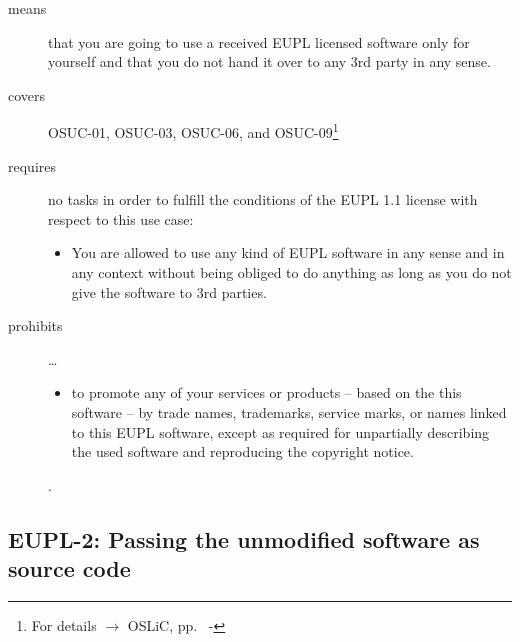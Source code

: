 \begin{description}

\item[means] that you are going to use a received EUPL licensed software only
for yourself and that you do not hand it over to any 3rd party in any sense.

\item[covers] OSUC-01, OSUC-03, OSUC-06, and OSUC-09\footnote{For details 
$\rightarrow$ OSLiC, pp.\ \pageref{OSUC-01-DEF} - \pageref{OSUC-09-DEF}}

\item[requires] no tasks in order to fulfill the conditions of the EUPL 1.1
license with respect to this use case:
  \begin{itemize}
    \item You are allowed to use any kind of EUPL software in any sense and in
    any context without being obliged to do anything as long as you do not
    give the software to 3rd parties.
  \end{itemize}
  
\item[prohibits] \ldots
\begin{itemize}
  \item to promote any of your services or products -- based on the this software
  -- by trade names, trademarks, service marks, or names linked to this EUPL
  software, except as required for unpartially describing the used software and
  reproducing the copyright notice.
\end{itemize}.

\end{description}

\subsection{EUPL-2: Passing the unmodified software as source code}
\label{OSUC-02-EUPL} \label{OSUC-05-EUPL} \label{OSUC-07-EUPL} 

